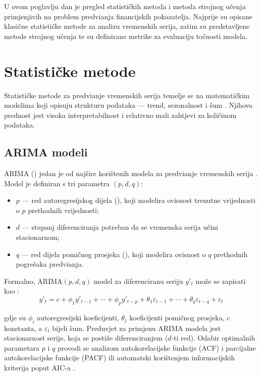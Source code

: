 \documentclass[zavrsnirad]{fer}
\begin{document}
U ovom poglavlju dan je pregled statisti\v{c}kih metoda i metoda strojnog u\v{c}enja primjenjivih na problem predvi\dj anja financijskih pokazatelja. Najprije su opisane klasi\v{c}ne statisti\v{c}ke metode za analizu vremenskih serija, zatim su predstavljene metode strojnog u\v{c}enja te su definirane metrike za evaluaciju to\v{c}nosti modela.

\section{Statisti\v{c}ke metode}
\label{sec:statisticke_metode}

Statisti\v{c}ke metode za predvi\dj anje vremenskih serija temelje se na matemati\v{c}kim modelima koji opisuju strukturu podataka --- trend, sezonalnost i \v{s}um \citep{hyndman2021forecasting}. Njihova prednost jest visoka interpretabilnost i relativno mali zahtjevi za koli\v{c}inom podataka.

\subsection{ARIMA modeli}
\label{subsec:arima}

ARIMA () jedan je od naj\v{s}ire kori\v{s}tenih modela za predvi\dj anje vremenskih serija \citep{box1970time}. Model je definiran s tri parametra $(p, d, q)$:

\begin{itemize}
    \item $p$ --- red autoregresijskog dijela (), koji modelira ovisnost trenutne vrijednosti o $p$ prethodnih vrijednosti;
    \item $d$ --- stupanj diferenciranja potreban da se vremenska serija u\v{c}ini stacionarnom;
    \item $q$ --- red dijela pomičnog prosjeka (), koji modelira ovisnost o $q$ prethodnih pogre\v{s}aka predvi\dj anja.
\end{itemize}

Formalno, ARIMA$(p,d,q)$ model za diferenciranu seriju $y'_t$ mo\v{z}e se zapisati kao \citep{hyndman2021forecasting}:
\begin{equation}
    y'_t = c + \phi_1 y'_{t-1} + \cdots + \phi_p y'_{t-p} + \theta_1 \varepsilon_{t-1} + \cdots + \theta_q \varepsilon_{t-q} + \varepsilon_t
    \label{eq:arima}
\end{equation}

gdje su $\phi_i$ autoregresijski koeficijenti, $\theta_j$ koeficijenti pomičnog prosjeka, $c$ konstanta, a $\varepsilon_t$ bijeli \v{s}um. Preduvjet za primjenu ARIMA modela jest stacionarnost serije, koja se posti\v{z}e diferenciranjem ($d$-ti red). Odabir optimalnih parametara $p$ i $q$ provodi se analizom autokorelacijske funkcije (ACF) i parcijalne autokorelacijske funkcije (PACF) ili automatski kori\v{s}tenjem informacijskih kriterija poput AIC-a \citep{hyndman2021forecasting}.
\end{document}
